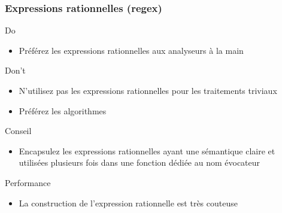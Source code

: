 \documentclass[C++.tex]{subfiles}
\begin{document}
\begin{frame}[fragile]
	\frametitle{Expressions rationnelles (regex)}
	\begin{exampleblock}{Do}
		\begin{itemize}
			\item Préférez les expressions rationnelles aux analyseurs \og à la main\fg{}
		\end{itemize}
	\end{exampleblock}

	\begin{alertblock}{Don't}
		\begin{itemize}
			\item N'utilisez pas les expressions rationnelles pour les traitements triviaux
			\item Préférez les algorithmes
		\end{itemize}

 		\end{alertblock}

	\begin{block}{Conseil}
		\begin{itemize}
			\item Encapsulez les expressions rationnelles ayant une sémantique claire et utilisées plusieurs fois dans une fonction dédiée au nom évocateur
		\end{itemize}
	\end{block}

	\begin{block}{Performance}
		\begin{itemize}
			\item La construction de l'expression rationnelle est très couteuse
		\end{itemize}
	\end{block}
\end{frame}
\end{document}
